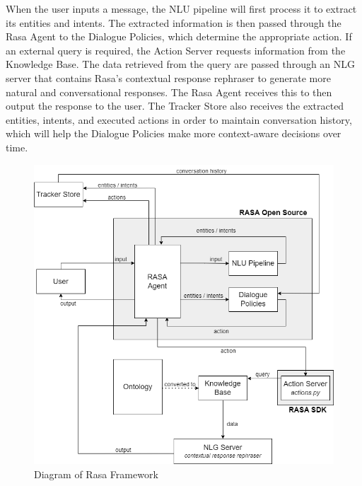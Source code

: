     When the user inputs a message, the NLU pipeline will first process it to extract its entities and intents. The extracted information is then passed through the Rasa Agent to the Dialogue Policies, which determine the appropriate action. If an external query is required, the Action Server requests information from the Knowledge Base. The data retrieved from the query are passed through an NLG server that contains Rasa's contextual response rephraser to generate more natural and conversational responses. The Rasa Agent receives this to then output the response to the user. The Tracker Store also receives the extracted entities, intents, and executed actions in order to maintain conversation history, which will help the Dialogue Policies make more context-aware decisions over time.

\begin{figure}[H]
    \centering
    \includegraphics[width=\linewidth]{figures/Rasa Framework.png}
    \caption{Diagram of Rasa Framework}
    \label{fig:rasa framework}
\end{figure}

